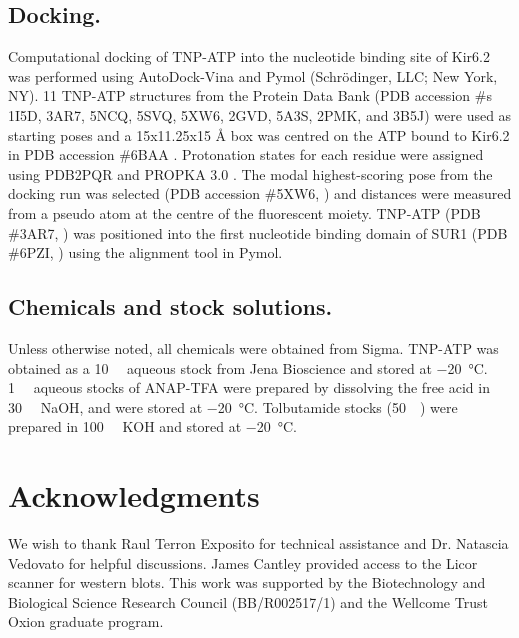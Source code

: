 \documentclass[9pt,lineno, onehalfspacing]{elife_modified}
\begin{document}
\subsection{Docking.}
Computational docking of TNP-ATP into the nucleotide binding site of Kir6.2 was performed using AutoDock-Vina \citep{118} and Pymol (Schrödinger, LLC; New York, NY).
11 TNP-ATP structures from the Protein Data Bank (PDB accession \#s 1I5D, 3AR7, 5NCQ, 5SVQ, 5XW6, 2GVD, 5A3S, 2PMK, and 3B5J) were used as starting poses and a 15x11.25x15 \si{\angstrom} box was centred on the ATP bound to Kir6.2 in PDB accession \#6BAA \citep{RN6}.
Protonation states for each residue were assigned using PDB2PQR and PROPKA 3.0 \citep{RN111}.
The modal highest-scoring pose from the docking run was selected (PDB accession \#5XW6, \cite{RN112}) and distances were measured from a pseudo atom at the centre of the fluorescent moiety.
TNP-ATP (PDB \#3AR7, \cite{RN53}) was positioned into the first nucleotide binding domain of SUR1 (PDB \#6PZI, \cite{RN113}) using the alignment tool in Pymol.

\subsection{Chemicals and stock solutions.}
Unless otherwise noted, all chemicals were obtained from Sigma.
TNP-ATP was obtained as a \SI{10}{\milli\Molar} aqueous stock from Jena Bioscience and stored at \SI{-20}{\degreeCelsius}. \SI{1}{\milli\Molar} aqueous stocks of ANAP-TFA were prepared by dissolving the free acid in \SI{30}{\milli\Molar} NaOH, and were stored at \SI{-20}{\degreeCelsius}. Tolbutamide stocks (\SI{50}{\milli\Molar}) were prepared in \SI{100}{\milli\Molar} KOH and stored at \SI{-20}{\degreeCelsius}.

\section{Acknowledgments}
We wish to thank Raul Terron Exposito for technical assistance and Dr. Natascia Vedovato for helpful discussions.
James Cantley provided access to the Licor scanner for western blots.
This work was supported by the Biotechnology and Biological Science Research Council (BB/R002517/1) and the Wellcome Trust Oxion graduate program.



\newpage
\end{document}
